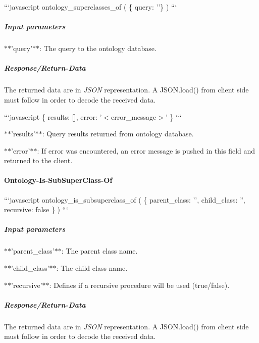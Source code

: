 ```javascript ontology\-\_\-superclasses\-\_\-of ( \{ query\-: ''\} ) ```

\subparagraph*{Input parameters}


\begin{DoxyItemize}
\item $\ast$$\ast$'query'$\ast$$\ast$\-: The query to the ontology database.
\end{DoxyItemize}

\subparagraph*{Response/\-Return-\/\-Data}

The returned data are in {\itshape J\-S\-O\-N} representation. A J\-S\-O\-N.\-load() from client side must follow in order to decode the received data.

```javascript \{ results\-: \mbox{[}\mbox{]}, error\-: '$<$error\-\_\-message$>$' \} ```


\begin{DoxyItemize}
\item $\ast$$\ast$'results'$\ast$$\ast$\-: Query results returned from ontology database.
\item $\ast$$\ast$'error'$\ast$$\ast$\-: If error was encountered, an error message is pushed in this field and returned to the client.
\end{DoxyItemize}

\paragraph*{Ontology-\/\-Is-\/\-Sub\-Super\-Class-\/\-Of}

```javascript ontology\-\_\-is\-\_\-subsuperclass\-\_\-of ( \{ parent\-\_\-class\-: '', child\-\_\-class\-: '', recursive\-: false \} ) ```

\subparagraph*{Input parameters}


\begin{DoxyItemize}
\item $\ast$$\ast$'parent\-\_\-class'$\ast$$\ast$\-: The parent class name.
\item $\ast$$\ast$'child\-\_\-class'$\ast$$\ast$\-: The child class name.
\item $\ast$$\ast$'recursive'$\ast$$\ast$\-: Defines if a recursive procedure will be used (true/false).
\end{DoxyItemize}

\subparagraph*{Response/\-Return-\/\-Data}

The returned data are in {\itshape J\-S\-O\-N} representation. A J\-S\-O\-N.\-load() from client side must follow in order to decode the received data.

